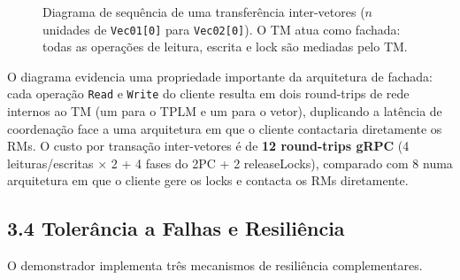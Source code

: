 \begin{figure}[ht]
\caption{Diagrama de sequência de uma transferência inter-vetores ($n$ unidades de
  \texttt{Vec01[0]} para \texttt{Vec02[0]}). O TM atua como fachada: todas as
  operações de leitura, escrita e lock são mediadas pelo TM.}
\label{fig:sequence}
\end{figure}
\FloatBarrier

O diagrama evidencia uma propriedade importante da arquitetura de fachada: cada operação
\texttt{Read} e \texttt{Write} do cliente resulta em dois round-trips de rede internos ao TM
(um para o TPLM e um para o vetor), duplicando a latência de coordenação face a uma arquitetura
em que o cliente contactaria diretamente os RMs.
O custo por transação inter-vetores é de \textbf{12 round-trips gRPC} (4 leituras/escritas
$\times$ 2 + 4 fases do 2PC + 2 releaseLocks), comparado com 8 numa arquitetura em que o
cliente gere os locks e contacta os RMs diretamente.

\subsection*{3.4 Tolerância a Falhas e Resiliência}

O demonstrador implementa três mecanismos de resiliência complementares.

